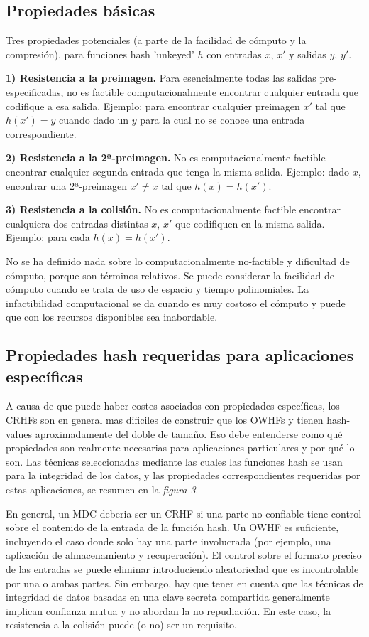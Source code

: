 \documentclass[a4paper, 12pt]{article} %
\begin{document}
\subsection{Propiedades básicas}
Tres propiedades potenciales (a parte de la facilidad de cómputo y la compresión), para funciones
hash 'unkeyed' $h$ con entradas $x$, $x'$ y salidas $y$, $y'$.

\textbf{1) Resistencia a la preimagen.} Para esencialmente todas las salidas pre-especificadas, no es factible
computacionalmente encontrar cualquier entrada que codifique a esa salida. Ejemplo: para encontrar
cualquier preimagen $x'$ tal que $h(x') = y$ cuando dado un $y$ para la cual no se
conoce una entrada correspondiente.

\textbf{2) Resistencia a la 2ª-preimagen.} No es computacionalmente factible encontrar cualquier segunda entrada
que tenga la misma salida. Ejemplo: dado $x$, encontrar una
2ª-preimagen $x' \neq x$ tal que $h(x)=h(x')$.

\textbf{3) Resistencia a la colisión.} No es computacionalmente factible encontrar cualquiera dos entradas
distintas $x$, $x'$ que codifiquen en la misma salida. Ejemplo: para cada $h(x) = h(x')$.

No se ha definido nada sobre lo computacionalmente no-factible y dificultad de cómputo, porque son
términos relativos. Se puede considerar la facilidad de cómputo cuando se trata de uso de espacio y
tiempo polinomiales. La infactibilidad computacional se da cuando es muy costoso el cómputo y puede
que con los recursos disponibles sea inabordable.

\newpage
\subsection{Propiedades hash requeridas para aplicaciones específicas}
A causa de que puede haber costes asociados con propiedades específicas, los CRHFs son en general
mas dificiles de construir que los OWHFs y tienen hash-values aproximadamente del doble de tamaño.
Eso debe entenderse como qué propiedades son realmente necesarias para aplicaciones particulares y
por qué lo son. Las técnicas seleccionadas mediante las cuales las funciones hash se usan para
la integridad de los datos, y las propiedades correspondientes requeridas por estas aplicaciones,
se resumen en la \textit{figura 3}.

En general, un MDC deberia ser un CRHF si una parte no confiable tiene control sobre el contenido
de la entrada de la función hash. Un OWHF es suficiente, incluyendo el caso donde solo hay una
parte involucrada (por ejemplo, una aplicación de almacenamiento y recuperación).
El control sobre el formato preciso de las entradas se puede eliminar introduciendo aleatoriedad
que es incontrolable por una o ambas partes. Sin embargo, hay que tener en cuenta que las técnicas
de integridad de datos basadas en una clave secreta compartida generalmente implican confianza
mutua y no abordan la no repudiación. En este caso, la resistencia a la colisión puede (o no) ser
un requisito.
\end{document}
